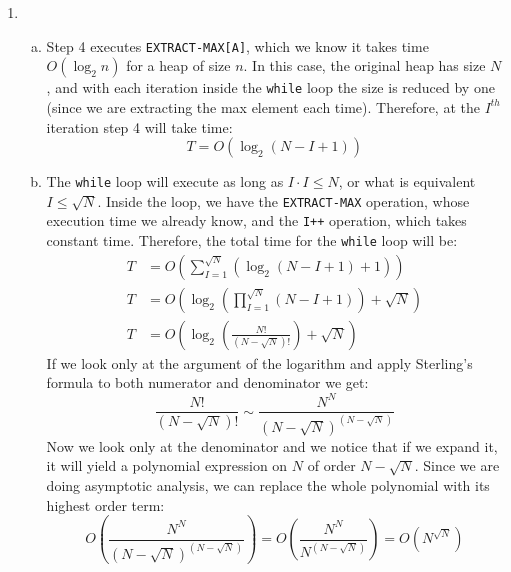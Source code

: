 \documentclass{article}
\begin{document}
\begin{enumerate}[1.]
    \item 
    \begin{enumerate}[(a)]
        \item Step 4 executes \texttt{EXTRACT-MAX[A]}, which we know it takes time $O(\log_2n)$ for a heap of size $n$. In this case, the original heap has size $N$, and with each iteration inside the \texttt{while} loop the size is reduced by one (since we are extracting the max element each time). Therefore, at the $I^{th}$ iteration step 4 will take time:
        \begin{equation*}
            T = O(\log_2(N-I+1))
        \end{equation*}
        \item The \texttt{while} loop will execute as long as $I \cdot I \leq N$, or what is equivalent $I \leq \sqrt{N}$. Inside the loop, we have the \texttt{EXTRACT-MAX} operation, whose execution time we already know, and the \texttt{I++} operation, which takes constant time. Therefore, the total time for the \texttt{while} loop will be:
        \begin{align*}
            T &= O\left(\sum_{I = 1}^{\sqrt{N}}\left(\log_2(N - I + 1) + 1\right)\right) \\
            T &= O\left(\log_2\left(\prod_{I = 1}^{\sqrt{N}}(N - I + 1) \right) + \sqrt{N}\right) \\
            T &= O\left(\log_2\left(\frac{N!}{\left(N - \sqrt{N}\right)!}\right) + \sqrt{N}\right) 
        \end{align*}
        If we look only at the argument of the logarithm and apply Sterling's formula to both numerator and denominator we get:
        \begin{equation*}
            \frac{N!}{\left(N - \sqrt{N}\right)!} \sim \frac{N^N}{\left(N - \sqrt{N}\right)^{\left(N - \sqrt{N}\right)}}
        \end{equation*}
        Now we look only at the denominator and we notice that if we expand it, it will yield a polynomial expression on $N$ of order $N - \sqrt{N}$. Since we are doing asymptotic analysis, we can replace the whole polynomial with its highest order term:
        \begin{equation*}
            O\left(\frac{N^N}{\left(N - \sqrt{N}\right)^{\left(N - \sqrt{N}\right)}}\right) = O\left(\frac{N^N}{N^{\left(N - \sqrt{N}\right)}}\right) = O\left(N^{\sqrt{N}}\right)
        \end{equation*}

\end{enumerate}
\end{enumerate}
\end{document}
